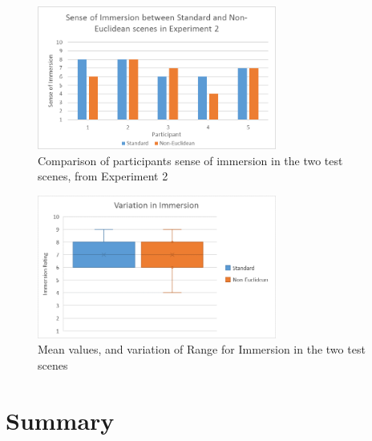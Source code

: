 			\begin{figure}[H]
				\includegraphics[width=0.7\textwidth]{Images/Compare_Immersion_Exp_2}
				\centering
				\caption{Comparison of participants sense of immersion in the two test scenes, from Experiment 2}
				\label{exp:fig:compare_immersion_exp2}
			\end{figure}

			\begin{figure}[H]
				\includegraphics[width=0.7\textwidth]{Images/Compare_Immersion_Variation}
				\centering
				\caption{Mean values, and variation of Range for Immersion in the two test scenes}
				\label{exp:fig:compare_immersion_variation}
			\end{figure}

	\section{Summary}
	\label{exp:summary}

